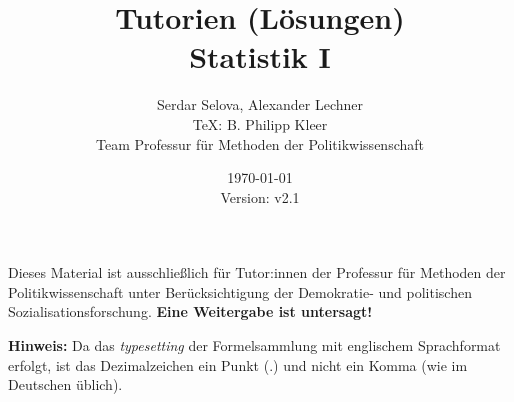 \documentclass[11pt,a4paper]{article}
\author{Serdar Selova, Alexander Lechner \\ \TeX: B. Philipp Kleer \\ \footnotesize Team Professur für Methoden der Politikwissenschaft}
\title{%
  Tutorien (Lösungen) \\
  \normalsize Statistik I \\
  }
\date{\today \\ \small{Version: v2.1}}
\begin{document}
\maketitle

Dieses Material ist ausschließlich für Tutor:innen der Professur für Methoden der Politikwissenschaft unter Berücksichtigung der Demokratie- und politischen Sozialisationsforschung. \textbf{Eine Weitergabe ist untersagt!}

\textbf{Hinweis:} Da das \textit{typesetting} der Formelsammlung mit englischem Sprachformat erfolgt, ist das Dezimalzeichen ein Punkt ($.$) und nicht ein Komma (wie im Deutschen üblich).

\tableofcontents 

\newpage



\newpage



\newpage



\newpage



\newpage



\newpage



\newpage



\newpage



\newpage


\end{document}
